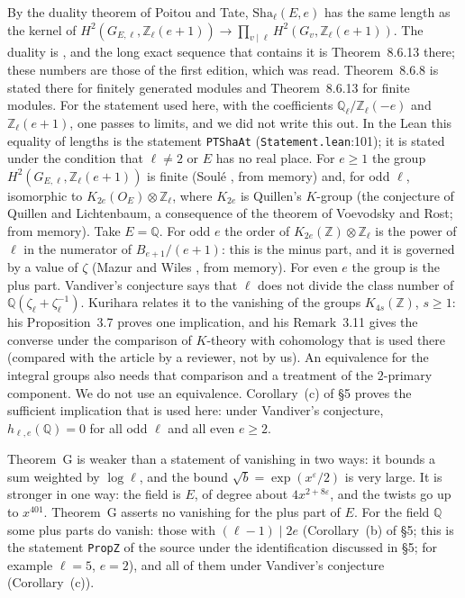 \documentclass[11pt,letterpaper]{article}
\newcommand{\Z}{\mathbb Z}\newcommand{\Q}{\mathbb Q}\newcommand{\C}{\mathbb C}
\begin{document}
By the duality theorem of Poitou and Tate, $\mathrm{Sha}_\ell(E,e)$ has the same length as the kernel of
$H^2(G_{E,\ell},\Z_\ell(e+1))\to\prod_{v\mid\ell}H^2(G_v,\Z_\ell(e+1))$. The duality is
\cite[\S8.6, Thm.~8.6.8]{NSW00}, and the long exact sequence that contains it is Theorem~8.6.13 there; these
numbers are those of the first edition, which was read. Theorem~8.6.8 is stated there for finitely generated
modules and Theorem~8.6.13 for finite modules. For the statement used here, with the coefficients
$\Q_\ell/\Z_\ell(-e)$ and $\Z_\ell(e+1)$, one passes to limits, and we did not write this out. In the Lean this equality of
lengths is the statement \texttt{PTShaAt} (\texttt{Statement.lean}:101); it is stated under the condition
that $\ell\ne2$ or $E$ has no real place. For $e\ge1$ the group $H^2(G_{E,\ell},\Z_\ell(e+1))$ is finite
(Soul\'e \cite{Sou79}, from memory)
and, for odd $\ell$, isomorphic to $K_{2e}(O_E)\otimes\Z_\ell$, where $K_{2e}$ is Quillen's $K$-group (the
conjecture of Quillen and Lichtenbaum, a consequence of the theorem of Voevodsky and Rost; from memory). Take
$E=\Q$. For odd $e$ the order of $K_{2e}(\Z)\otimes\Z_\ell$ is the power of $\ell$ in the numerator of
$B_{e+1}/(e+1)$: this is the minus part, and it is governed by a value of $\zeta$ (Mazur and Wiles
\cite{MW84}, from memory). For even $e$ the group is the plus part. Vandiver's conjecture says that $\ell$ does not divide
the class number of $\Q(\zeta_\ell+\zeta_\ell^{-1})$. Kurihara \cite{Kur92} relates it to the vanishing
of the groups $K_{4s}(\Z)$, $s\ge1$: his Proposition~3.7 proves one implication, and his Remark~3.11 gives the
converse under the comparison of $K$-theory with cohomology that is used there (compared with the article by
a reviewer, not by us). An equivalence for the
integral groups also needs that comparison and a treatment of the $2$-primary component. We do not use an
equivalence. Corollary~(c) of \S5 proves the sufficient implication that is used here: under Vandiver's
conjecture, $h_{\ell,e}(\Q)=0$ for all odd $\ell$ and all even $e\ge2$.

Theorem~G is weaker than a statement of vanishing in two ways: it bounds a sum weighted by $\log\ell$, and
the bound $\sqrt b=\exp(x^{\varepsilon}/2)$ is very large. It is stronger in one way: the field is $E$, of
degree about $4x^{2+8\varepsilon}$, and the twists go up to $x^{401}$. Theorem~G asserts no vanishing for
the plus part of $E$. For the field $\Q$ some plus parts do vanish: those with $(\ell-1)\mid2e$
(Corollary~(b) of \S5; this is the statement \texttt{PropZ} of the source under the identification
discussed in \S5; for example $\ell=5$, $e=2$), and all of
them under Vandiver's conjecture (Corollary~(c)).
\end{document}
